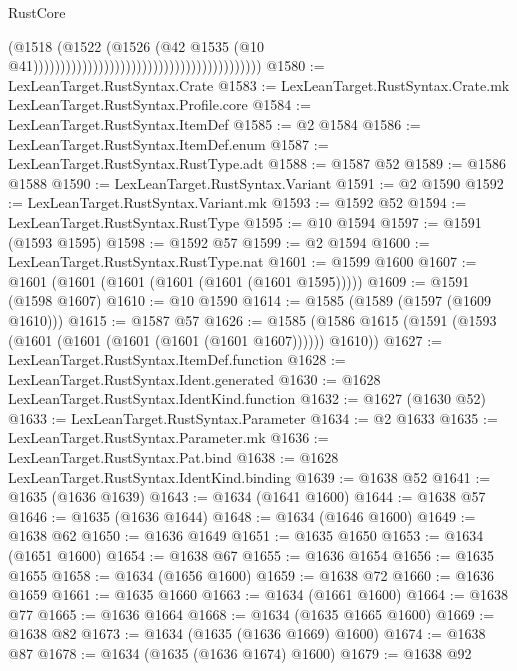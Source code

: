 \begin{lexlean}{RustCore}
\begin{coremodule}
                                                                              (@1518
                                                                                (@1522
                                                                                  (@1526
                                                                                    (@42
                                                                                      @1535
                                                                                      (@10
                                                                                        @41))))))))))))))))))))))))))))))))))))))))))
@1580 := LexLeanTarget.RustSyntax.Crate
@1583 := LexLeanTarget.RustSyntax.Crate.mk LexLeanTarget.RustSyntax.Profile.core
@1584 := LexLeanTarget.RustSyntax.ItemDef
@1585 := @2 @1584
@1586 := LexLeanTarget.RustSyntax.ItemDef.enum
@1587 := LexLeanTarget.RustSyntax.RustType.adt
@1588 := @1587 @52
@1589 := @1586 @1588
@1590 := LexLeanTarget.RustSyntax.Variant
@1591 := @2 @1590
@1592 := LexLeanTarget.RustSyntax.Variant.mk
@1593 := @1592 @52
@1594 := LexLeanTarget.RustSyntax.RustType
@1595 := @10 @1594
@1597 := @1591 (@1593 @1595)
@1598 := @1592 @57
@1599 := @2 @1594
@1600 := LexLeanTarget.RustSyntax.RustType.nat
@1601 := @1599 @1600
@1607 := @1601 (@1601 (@1601 (@1601 (@1601 (@1601 @1595)))))
@1609 := @1591 (@1598 @1607)
@1610 := @10 @1590
@1614 := @1585 (@1589 (@1597 (@1609 @1610)))
@1615 := @1587 @57
@1626 := @1585 (@1586 @1615 (@1591 (@1593 (@1601 (@1601 (@1601 (@1601 (@1601 @1607)))))) @1610))
@1627 := LexLeanTarget.RustSyntax.ItemDef.function
@1628 := LexLeanTarget.RustSyntax.Ident.generated
@1630 := @1628 LexLeanTarget.RustSyntax.IdentKind.function
@1632 := @1627 (@1630 @52)
@1633 := LexLeanTarget.RustSyntax.Parameter
@1634 := @2 @1633
@1635 := LexLeanTarget.RustSyntax.Parameter.mk
@1636 := LexLeanTarget.RustSyntax.Pat.bind
@1638 := @1628 LexLeanTarget.RustSyntax.IdentKind.binding
@1639 := @1638 @52
@1641 := @1635 (@1636 @1639)
@1643 := @1634 (@1641 @1600)
@1644 := @1638 @57
@1646 := @1635 (@1636 @1644)
@1648 := @1634 (@1646 @1600)
@1649 := @1638 @62
@1650 := @1636 @1649
@1651 := @1635 @1650
@1653 := @1634 (@1651 @1600)
@1654 := @1638 @67
@1655 := @1636 @1654
@1656 := @1635 @1655
@1658 := @1634 (@1656 @1600)
@1659 := @1638 @72
@1660 := @1636 @1659
@1661 := @1635 @1660
@1663 := @1634 (@1661 @1600)
@1664 := @1638 @77
@1665 := @1636 @1664
@1668 := @1634 (@1635 @1665 @1600)
@1669 := @1638 @82
@1673 := @1634 (@1635 (@1636 @1669) @1600)
@1674 := @1638 @87
@1678 := @1634 (@1635 (@1636 @1674) @1600)
@1679 := @1638 @92

\end{coremodule}
\end{lexlean}
